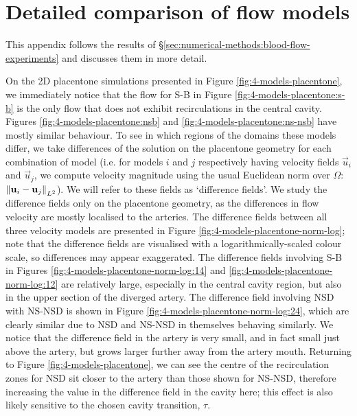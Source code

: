 \chapter{Detailed comparison of flow models} \label{sec:flow-comparison}
    This appendix follows the results of \S\ref{sec:numerical-methods:blood-flow-experiments} and discusses them in more detail.

    On the 2D placentone simulations presented in Figure \ref{fig:4-models-placentone}, we immediately notice that the flow for S-B in Figure \ref{fig:4-models-placentone:s-b} is the only flow that does not exhibit recirculations in the central cavity. Figures \ref{fig:4-models-placentone:nsb} and \ref{fig:4-models-placentone:ns-nsb} have mostly similar behaviour. To see in which regions of the domains these models differ, we take differences of the solution on the placentone geometry for each combination of model (i.e. for models $i$ and $j$ respectively having velocity fields $\vec{u}_i$ and $\vec{u}_j$, we compute velocity magnitude using the usual Euclidean norm over $\Omega$: $\norm{\boldsymbol{\mathbf{u}}_i - \boldsymbol{\mathbf{u}}_j}_{L^2}$). We will refer to these fields as `difference fields'. We study the difference fields only on the placentone geometry, as the differences in flow velocity are mostly localised to the arteries. The difference fields between all three velocity models are presented in Figure \ref{fig:4-models-placentone-norm-log}; note that the difference fields are visualised with a logarithmically-scaled colour scale, so differences may appear exaggerated. The difference fields involving S-B in Figures \ref{fig:4-models-placentone-norm-log:14} and \ref{fig:4-models-placentone-norm-log:12} are relatively large, especially in the central cavity region, but also in the upper section of the diverged artery. The difference field involving NSD with NS-NSD is shown in Figure \ref{fig:4-models-placentone-norm-log:24}, which are clearly similar due to NSD and NS-NSD in themselves behaving similarly. We notice that the difference field in the artery is very small, and in fact small just above the artery, but grows larger further away from the artery mouth. Returning to Figure \ref{fig:4-models-placentone}, we can see the centre of the recirculation zones for NSD sit closer to the artery than those shown for NS-NSD, therefore increasing the value in the difference field in the cavity here; this effect is also likely sensitive to the chosen cavity transition, $\tau$.

